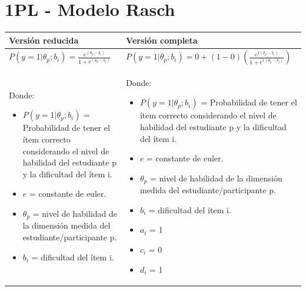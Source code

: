 \documentclass[
  letterpaper,
  DIV=11,
  numbers=noendperiod]{scrreprt}
\begin{document}
\section{1PL - Modelo Rasch}\label{pl---modelo-rasch}

\begin{longtable}[]{@{}
  >{\raggedright\arraybackslash}p{}
  >{\raggedright\arraybackslash}p{}@{}}
\toprule\noalign{}
\begin{minipage}[b]{\linewidth}\raggedright
Versión reducida
\end{minipage} & \begin{minipage}[b]{\linewidth}\raggedright
Versión completa
\end{minipage} \\
\midrule\noalign{}
\endhead
\bottomrule\noalign{}
\endlastfoot
\(
 P(y = 1|\theta_p;b_i) = \frac{e^{(\theta_p-b_i)}}{1+e^{(\theta_p-b_i)}}
\) & \(
P(y=1|\theta_p;b_i) = 0 + (1-0)\left(\frac{e^{1(\theta_p-b_i)}}{1 + e^{1(\theta_p-b_i)}}\right)
\) \\
\begin{minipage}[t]{\linewidth}\raggedright
Donde:

\begin{itemize}
\item
  \(P(y=1|\theta_p;b_i)\) = Probabilidad de tener el ítem correcto
  considerando el nivel de habilidad del estudiante p y la dificultad
  del ítem i.
\item
  \(e\) = constante de euler.
\item
  \(\theta_p\) = nivel de habilidad de la dimensión medida del
  estudiante/participante p.
\item
  \(b_i\) = dificultad del ítem i.
\end{itemize}
\end{minipage} & \begin{minipage}[t]{\linewidth}\raggedright
Donde:

\begin{itemize}
\item
  \(P(y=1|\theta_p;b_i)\) = Probabilidad de tener el ítem correcto
  considerando el nivel de habilidad del estudiante p y la dificultad
  del ítem i.
\item
  \(e\) = constante de euler.
\item
  \(\theta_p\) = nivel de habilidad de la dimensión medida del
  estudiante/participante p.
\item
  \(b_i\) = dificultad del ítem i.
\item
  \(a_i\) = 1
\item
  \(c_i\) = 0
\item
  \(d_i\) = 1
\end{itemize}
\end{minipage} \\
\end{longtable}
\end{document}
